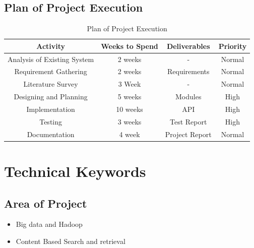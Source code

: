 \documentclass[oneside,a4paper,12pt]{report}
\begin{document}
\section{Plan of Project Execution}
\begin{table}[!htbp]
\begin{center}
\def\arraystretch{1.5}
  \begin{tabular}{| c | c | c | c |}
       \hline

	\textbf{Activity} & \textbf{Weeks to Spend} & \textbf{Deliverables} & \textbf{Priority}\\ \hline
	Analysis of Existing System & 2 weeks & - & Normal \\ \hline
	Requirement Gathering & 2 weeks & Requirements & Normal \\ \hline 
	Literature Survey & 3 Week & - & Normal \\ \hline
	Designing and Planning & 5 weeks & Modules & High \\ \hline
	Implementation & 10 weeks & API & High \\ \hline
	Testing & 3 weeks & Test Report & High \\ \hline
	Documentation & 4 week & Project Report & Normal \\ \hline
\end{tabular}
 \caption { Plan of Project Execution }
 \label{tab:hreq}
\end{center}

\end{table}



\chapter{Technical Keywords}
\section{Area of Project}
\begin{itemize}
\item Big data and Hadoop
\item Content Based Search and retrieval
\end{itemize}
\end{document}
